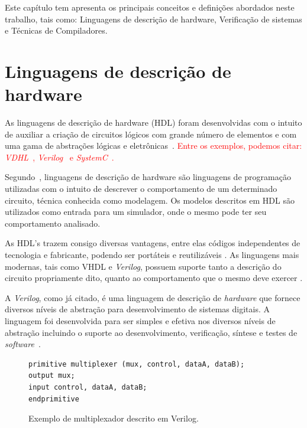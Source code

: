 \label{chapter:conceitos}
Este capítulo tem apresenta os principais conceitos e definições abordados neste trabalho, tais como: Linguagens de descrição de hardware, Verificação de sistemas e Técnicas de Compiladores.

\section{Linguagens de descrição de hardware}

As linguagens de descrição de hardware (HDL) foram desenvolvidas com o intuito de auxiliar a criação de circuitos lógicos com grande número de elementos e com uma gama de abstrações lógicas e eletrônicas~\cite{thomas2008verilog}. \textcolor{red}{Entre os exemplos, podemos citar: \textit{VDHL}~\cite{IEEEVHDLLanguage}, \textit{Verilog}~\cite{IEEEVerilogLanguage} e \textit{SystemC}~\cite{IEEESystemCLanguage}.}

\par
Segundo~, linguagens de descrição de hardware são linguagens de programação utilizadas com o intuito de descrever o comportamento de um determinado circuito, técnica conhecida como modelagem. Os modelos descritos em HDL são utilizados como entrada para um simulador, onde o mesmo pode ter seu comportamento analisado.

\par
As HDL's trazem consigo diversas vantagens, entre elas códigos independentes de tecnologia e fabricante, podendo ser portáteis e reutilizáveis \cite{cappelattipraticando}. As linguagens mais modernas, tais como VHDL e \textit{Verilog}, possuem suporte tanto a descrição do circuito propriamente dito, quanto ao comportamento que o mesmo deve exercer \cite{christen1999vhdl}.

\par
A \textit{Verilog}, como já citado, é uma linguagem de descrição de \textit{hardware} que fornece diversos níveis de abstração para desenvolvimento de sistemas digitais\cite{thomas2008verilog}. A linguagem foi desenvolvida para ser simples e efetiva nos diversos níveis de abstração incluindo o suporte ao desenvolvimento, verificação, síntese e testes de \textit{software}~\cite{IEEEVerilogLanguage}.

\begin{figure}[H]
\caption{\label{fig:mux_verilog} Exemplo de multiplexador descrito em Verilog.}
	\begin{center}
    \begin{minipage}{0.7\textwidth}
    \begin{lstlisting}       
primitive multiplexer (mux, control, dataA, dataB);
output mux;
input control, dataA, dataB;
endprimitive
\end{lstlisting}
    \end{minipage}
	\end{center}
\end{figure}

